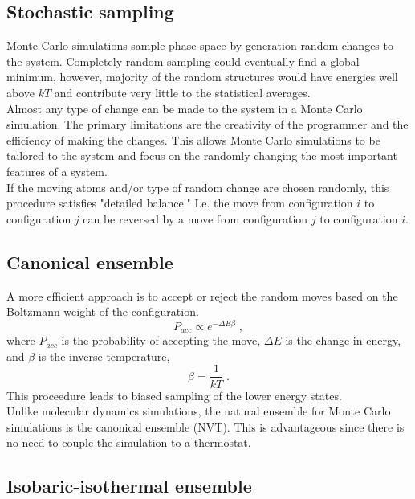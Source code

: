 \documentclass[12pt]{report}
\begin{document}
\subsection{Stochastic sampling}

Monte Carlo simulations sample phase space by generation random changes to
the system. Completely random sampling could eventually find a global
minimum, however, majority of the random structures would have energies well
above $kT$ and contribute very little to the statistical averages. \\

Almost any type of change can be made to the system in a Monte Carlo
simulation. The primary limitations are the creativity of the programmer and
the efficiency of making the changes. This allows Monte Carlo simulations to
be tailored to the system and focus on the randomly changing the most important 
features of a system. \\

If the moving atoms and/or type of random change are chosen randomly, this
procedure satisfies "detailed balance." I.e. the move from configuration $i$
to configuration $j$ can be reversed by a move from configuration $j$ to
configuration $i$.

\subsection{Canonical ensemble}

A more efficient approach is to accept or reject the random moves based on
the Boltzmann weight of the configuration.
\begin{equation}
 P_{acc} \propto e^{-\Delta E\beta} \; ,
\end{equation}
where $P_{acc}$ is the probability of accepting the move, $\Delta E$ is the 
change in energy, and $\beta$ is the inverse temperature,
\begin{equation} 
 \beta = \frac{1}{kT} \; .
\end{equation}
This proceedure leads to biased sampling of the lower energy states. \\

Unlike molecular dynamics simulations, the natural ensemble for Monte Carlo
simulations is the canonical ensemble (NVT). This is advantageous since there
is no need to couple the simulation to a thermostat.

\subsection{Isobaric-isothermal ensemble}
\end{document}
